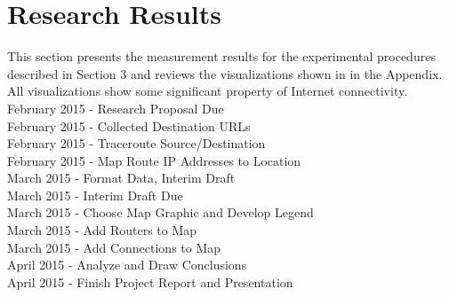 \documentclass{sigcomm-alternate}
\begin{document}
\section{Research Results}
This section presents the measurement results for the experimental procedures described in Section 3 and reviews the visualizations shown in in the Appendix. All visualizations show some significant property of Internet connectivity.
\indent
{} February 2015 - Research Proposal Due \\
 February 2015 - Collected Destination URLs \\
 February 2015 - Traceroute Source/Destination \\
 February 2015 - Map Route IP Addresses to Location\\ 
 March 2015 - Format Data, Interim Draft \\
 March 2015 - Interim Draft Due \\
 March 2015 - Choose Map Graphic and Develop Legend \\
 March 2015 - Add Routers to Map \\
 March 2015 - Add Connections to Map \\
 April 2015 - Analyze and Draw Conclusions\\ 
 April 2015 - Finish Project Report and Presentation\\\




\end{document}
